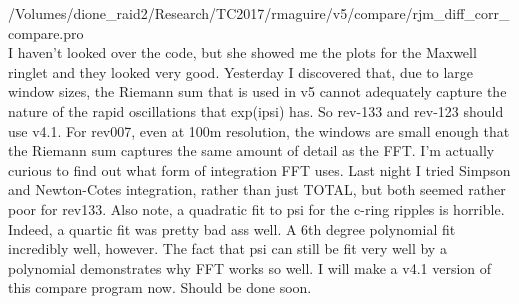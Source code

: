 \documentclass[crop=false,class=article,oneside]{standalone}
\begin{document}
/Volumes/dione\_raid2/Research/TC2017/rmaguire/v5/compare/rjm\_diff\_corr\_compare.pro\\
I haven't looked over the code, but she showed me the plots for the Maxwell ringlet and they looked very good. Yesterday I discovered that, due to large window sizes, the Riemann sum that is used in v5 cannot adequately capture the nature of the rapid oscillations that exp(ipsi) has. So rev-133 and rev-123 should use v4.1. For rev007, even at 100m resolution, the windows are small enough that the Riemann sum captures the same amount of detail as the FFT. I'm actually curious to find out what form of integration FFT uses. Last night I tried Simpson and Newton-Cotes integration, rather than just TOTAL, but both seemed rather poor for rev133. Also note, a quadratic fit to psi for the c-ring ripples is horrible. Indeed, a quartic fit was pretty bad ass well. A 6th degree polynomial fit incredibly well, however. The fact that psi can still be fit very well by a polynomial demonstrates why FFT works so well. I will make a v4.1 version of this compare program now. Should be done soon.
\end{document}

